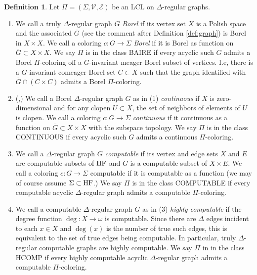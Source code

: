 \documentclass[11pt]{amsart}
\theoremstyle{definition}
\newtheorem{definition}[theorem]{Definition}
\newcommand{\HF}{\textnormal{HF}}
\begin{document}
\begin{definition}
	Let $\Pi = (\Sigma,\mathcal{V},\mathcal{E})$ be an LCL on $\Delta$-regular graphs.
	\begin{enumerate}
		\item We call a truly $\Delta$-regular graph $G$ \textit{Borel} if its vertex set $X$ is a Polish space and the associated $\overline{G}$ (see the comment after Definition \ref{def:graph}) is Borel in $X \times X$. We call a coloring $c:G \rightarrow \Sigma$ \textit{Borel} if it is Borel as function on $\overline{G} \subset X \times X$. We say $\Pi$ is in the class BAIRE if every acyclic such $G$ admits a Borel $\Pi$-coloring off a $G$-invariant meager Borel subset of vertices. I.e, there is a $G$-invariant comeager Borel set $C \subset X$ such that the graph identified with $\overline{G} \cap (C \times C)$ admits a Borel $\Pi$-coloring.
		
		\item (\cite{bernshteyn_continuous},\cite{BCG_Trees2}) We call a Borel $\Delta$-regular graph $G$ as in (1) \textit{continuous} if $X$ is zero-dimensional and for any clopen $U \subset X$, the set of neighbors of elements of $U$ is clopen. We call a coloring $c: G \rightarrow \Sigma$ \textit{continuous} if it continuous as a function on $\overline{G} \subset X \times X$ with the subspace topology. We say $\Pi$ is in the class CONTINUOUS if every acyclic such $G$ admits a continuous $\Pi$-coloring.
		
		
		\item We call a $\Delta$-regular graph $G$ \textit{computable} if its vertex and edge sets $X$ and $E$ are computable subsets of $\HF$ and $G$ is a computable subset of $X \times E$. We call a coloring $c : G \rightarrow \Sigma$ computable if it is computable as a function (we may of course assume $\Sigma \subset \HF$.) We say $\Pi$ is in the class COMPUTABLE if every computable acyclic $\Delta$-regular graph admits a computable $\Pi$-coloring.
	
	
        \item We call a computable $\Delta$-regular graph $G$ as in (3) \textit{highly computable} if the degree function $\deg:X \rightarrow \omega$ is computable. Since there are $\Delta$ edges incident to each $x \in X$ and $\deg(x)$ is the number of true such edges, this is equivalent to the set of true edges being computable. In particular, truly $\Delta$-regular computable graphs are highly computable. We say $\Pi$ in in the class HCOMP if every highly computable acyclic $\Delta$-regular graph admits a computable $\Pi$-coloring.
    \end{enumerate}
\end{definition}
\end{document}
